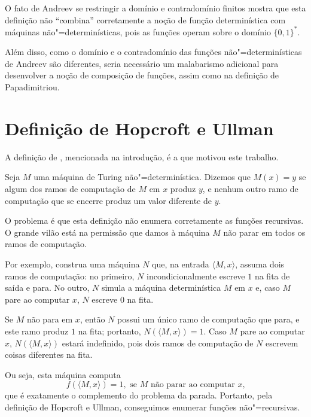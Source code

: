 O fato de Andreev se restringir a domínio e contradomínio finitos
mostra que esta definição não ``combina'' corretamente
a noção de função determinística com máquinas não"=determinísticas,
pois as funções operam sobre o domínio $\{0, 1\}^*$.

Além disso,
como o domínio e o contradomínio das funções não"=determinísticas de Andreev
são diferentes,
seria necessário um malabarismo adicional
para desenvolver a noção de composição de funções,
assim como na definição de Papadimitriou.

\section{Definição de Hopcroft e Ullman}

A definição de ,
mencionada na introdução,
é a que motivou este trabalho.
\begin{definition}
    Seja $M$ uma máquina de Turing não"=determinística.
    Dizemos que $M(x) = y$ se
    algum dos ramos de computação de $M$ em $x$ produz $y$,
    e nenhum outro ramo de computação que se encerre
    produz um valor diferente de $y$.
    \cite[p.~313]{HopcroftUllman1979}
\end{definition}

O problema é que esta definição não enumera corretamente as funções recursivas.
O grande vilão está na permissão que damos à máquina $M$
não parar em todos os ramos de computação.

Por exemplo,
construa uma máquina $N$ que,
na entrada $\langle M, x \rangle$,
assuma dois ramos de computação:
no primeiro,
$N$ incondicionalmente escreve $1$ na fita de saída e para.
No outro, $N$ simula a máquina determinística $M$ em $x$ e,
caso $M$ pare ao computar $x$,
$N$ escreve $0$ na fita.

Se $M$ não para em $x$,
então $N$ possui um único ramo de computação que para,
e este ramo produz $1$ na fita;
portanto, $N(\langle M, x \rangle) = 1$.
Caso $M$ pare ao computar $x$,
$N(\langle M, x \rangle)$ estará indefinido,
pois dois ramos de computação de $N$ escrevem coisas diferentes na fita.

Ou seja,
esta máquina computa
\begin{equation*}
    f(\langle M, x \rangle) = 1, \text{ se $M$ não parar ao computar $x$,}
\end{equation*}
que é exatamente o complemento do problema da parada.
Portanto,
pela definição de Hopcroft e Ullman,
conseguimos enumerar funções não"=recursivas.

